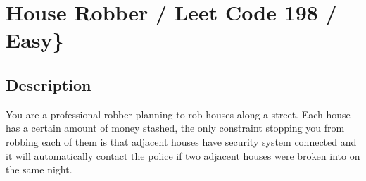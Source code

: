\documentclass[]{book}
\newenvironment{Shaded}{\begin{snugshade}}{\end{snugshade}}
\newcommand{\CommentTok}[1]{\textcolor[rgb]{0.56,0.35,0.01}{\textit{#1}}}
\newcommand{\DataTypeTok}[1]{\textcolor[rgb]{0.13,0.29,0.53}{#1}}
\newcommand{\DecValTok}[1]{\textcolor[rgb]{0.00,0.00,0.81}{#1}}
\newcommand{\FunctionTok}[1]{\textcolor[rgb]{0.00,0.00,0.00}{#1}}
\newcommand{\KeywordTok}[1]{\textcolor[rgb]{0.13,0.29,0.53}{\textbf{#1}}}
\newcommand{\NormalTok}[1]{#1}
\begin{document}
\begin{Shaded}
\end{Shaded}

\hypertarget{house-robber-leet-code-198-easy}{%
\section{House Robber / Leet Code 198 / Easy\}}\label{house-robber-leet-code-198-easy}}

\hypertarget{description-33}{%
\subsection{Description}\label{description-33}}

You are a professional robber planning to rob houses along a street. Each house has a certain amount of money stashed,
the only constraint stopping you from robbing each of them is that adjacent houses have security system connected and
it will automatically contact the police if two adjacent houses were broken into on the same night.
\end{document}
